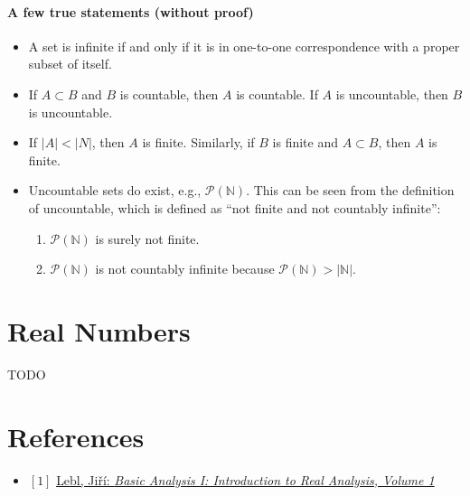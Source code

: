 \documentclass[12pt, letterpaper, oneside]{book}
\begin{document}
\subsubsection{A few true statements (without proof)}

\begin{itemize}
  \item A set is infinite if and only if it is in one-to-one correspondence
        with a proper subset of itself.
  \item If $A \subset B$ and $B$ is countable, then $A$ is countable. If $A$ is
        uncountable, then $B$ is uncountable.
  \item If $|A| < |N|$, then $A$ is finite. Similarly, if $B$ is finite and $A
          \subset B$, then $A$ is finite.
  \item Uncountable sets do exist, e.g., $\mathcal{P}(\mathbb{N})$. This can be
        seen from the definition of uncountable, which is defined as ``not finite
        and not countably infinite'':
        \begin{enumerate}
          \item $\mathcal{P}(\mathbb{N})$ is surely not finite.
          \item $\mathcal{P}(\mathbb{N})$ is not countably infinite because
                $\mathcal{P}(\mathbb{N}) > |\mathbb{N}|$.
        \end{enumerate}
\end{itemize}

%
%

\chapter{Real Numbers}

TODO

\chapter*{References}

\begin{itemize}
  \item $[1]$ \href{https://ocw.mit.edu/courses/18-100a-real-analysis-fall-2020/resources/mit18_100af20_basic_analysis/}{Lebl, Jiří: \it{Basic Analysis I: Introduction to Real Analysis, Volume 1}}
\end{itemize}
\end{document}
